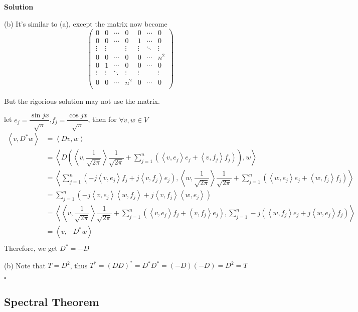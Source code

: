 \documentclass{article}
\newenvironment{solution}{%
{
    \textbf{Solution\\}
    }
}{
  \hfill $\square$ 
  \par\bigskip 
}
\newcommand{\parameter}[1]{\left(#1\right)}
\begin{document}
\begin{CJK}{UTF8}{gkai}
\begin{solution}
    (b) It's similar to (a), except the matrix now become
    \[\begin{pmatrix}
        0&0&\cdots&0&0&\cdots&0\\
        0&0&\cdots&0&1&\cdots&0\\
        \vdots&\vdots&&\vdots&\vdots&\ddots&\vdots\\
        0&0&\cdots&0&0&\cdots&n^2\\
        0&1&\cdots&0&0&\cdots&0\\
        \vdots&\vdots&\ddots&\vdots&\vdots&&\vdots\\
        0&0&\cdots&n^2&0&\cdots&0\\
    \end{pmatrix}\]

    But the rigorious solution may not use the matrix.

    let $e_j = \dfrac{\sin jx}{\sqrt{\pi}}$,$f_j = \dfrac{\cos jx}{\sqrt{\pi}}$, then for $\forall v,w \in V$
    \[\begin{aligned}
        \left<v,D^\ast w\right> &= \left<Dv, w\right>\\
        &= \left<D\parameter{\left<v,\dfrac{1}{\sqrt{2\pi}}\right>\dfrac{1}{\sqrt{2\pi}} + \sum_{j = 1}^n \parameter{\left<v,e_j\right> e_j  + \left<v,f_j\right> f_j}},w\right>\\
        &= \left<\sum_{j = 1}^n \parameter{-j \left<v,e_j\right> f_j  + j \left<v,f_j\right> e_j},\left<w,\dfrac{1}{\sqrt{2\pi}}\right>\dfrac{1}{\sqrt{2\pi}} + \sum_{j = 1}^n \parameter{\left<w,e_j\right> e_j  + \left<w,f_j\right> f_j}\right>\\
        &= \sum_{j = 1}^{n}\parameter{-j \left<v,e_j\right>\left<w,f_j\right> + j\left<v,f_j\right>\left<w,e_j\right> }\\
        &= \left<\left<v,\dfrac{1}{\sqrt{2\pi}}\right>\dfrac{1}{\sqrt{2\pi}} + \sum_{j = 1}^n \parameter{\left<v,e_j\right> f_j  +\left<v,f_j\right> e_j},\sum_{j = 1}^n - j\parameter{\left<w,f_j\right> e_j  + j\left<w,e_j\right> f_j}\right>\\
        &= \left<v,-D^\ast w\right>\\
    \end{aligned}\]
    Therefore, we get $D^\ast = - D$

    (b) Note that $T = D^2$, thus $T^\ast = (DD)^\ast = D^\ast D^\ast = (-D)(-D) = D^2 = T$
\end{solution}



\subsection{Spectral Theorem}


\end{CJK}
\end{document}
